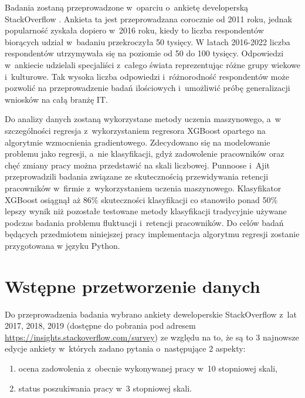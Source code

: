 Badania zostaną przeprowadzone w~oparciu o~ankietę developerską StackOverflow \cite{so-survey-info}.
Ankieta ta jest przeprowadzana corocznie od 2011 roku, jednak popularność zyskała dopiero w~2016 roku, kiedy to liczba respondentów biorących udział w~badaniu przekroczyła 50 tysięcy.
W latach 2016-2022 liczba respondentów utrzymywała się na poziomie od 50 do 100 tysięcy.
Odpowiedzi w~ankiecie udzielali specjaliści z~całego świata reprezentując różne grupy wiekowe i~kulturowe.
Tak wysoka liczba odpowiedzi i~różnorodność respondentów może pozwolić na przeprowadzenie badań ilościowych i~umożliwić próbę generalizacji wniosków na całą branżę IT.


Do analizy danych zostaną wykorzystane metody uczenia maszynowego, a~w szczególności regresja z~wykorzystaniem regresora XGBoost opartego na algorytmie wzmocnienia gradientowego.
Zdecydowano się na modelowanie problemu jako regresji, a~nie klasyfikacji, gdyż zadowolenie pracowników oraz chęć zmiany pracy można przedstawić na skali liczbowej.
Punnoose i~Ajit \cite{punnoose-2016} przeprowadzili badania związane ze skutecznością przewidywania retencji pracowników w~firmie z~wykorzystaniem uczenia maszynowego.
Klasyfikator XGBoost osiągnął aż 86\% skuteczności klasyfikacji co stanowiło ponad 50\% lepszy wynik niż pozostałe testowane metody klasyfikacji tradycyjnie używane podczas badania problemu fluktuacji i~retencji pracowników.
Do celów badań będących przedmiotem niniejszej pracy implementacja algorytmu regresji zostanie przygotowana w języku Python.


\section{Wstępne przetworzenie danych}\label{sec:analysis:preprocessing}
Do przeprowadzenia badania wybrano ankiety deweloperskie StackOverflow z~lat 2017, 2018, 2019 (dostępne do pobrania pod adresem \url{https://insights.stackoverflow.com/survey}) ze względu na to, że są to 3 najnowsze edycje ankiety w~których zadano pytania o~następujące 2 aspekty:
\begin{enumerate}
    \item ocena zadowolenia z~obecnie wykonywanej pracy w~10 stopniowej skali,
    \item status poszukiwania pracy w~3 stopniowej skali.
    \end{enumerate}

